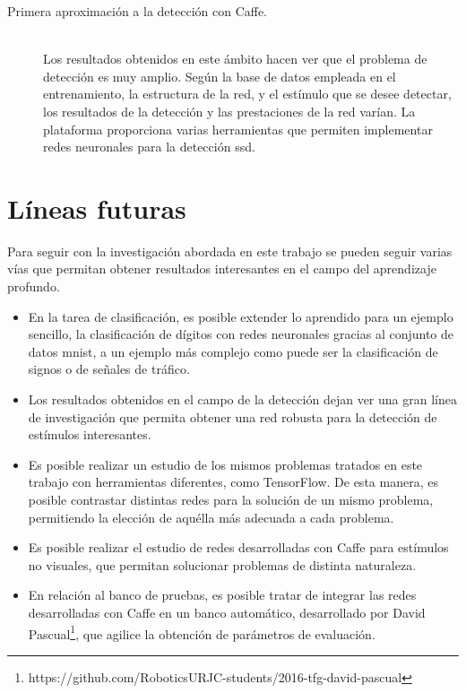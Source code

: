 \begin{description}
	\item[Primera aproximación a la detección con Caffe.] \hfill 
	\vspace{5pt}
	\\
	Los resultados obtenidos en este ámbito hacen ver que el problema de detección es muy amplio. Según la base de datos empleada en el entrenamiento, la estructura de la red, y el estímulo que se desee detectar, los resultados de la detección y las prestaciones de la red varían. La plataforma proporciona varias herramientas que permiten implementar redes neuronales para la detección \acrshort{ssd}.
\end{description}

\section{Líneas futuras}
Para seguir con la investigación abordada en este trabajo se pueden seguir varias vías que permitan obtener resultados interesantes en el campo del aprendizaje profundo.
\begin{itemize}
	\item En la tarea de clasificación, es posible extender lo aprendido para un ejemplo sencillo, la clasificación de dígitos con redes neuronales gracias al conjunto de datos \acrshort{mnist}, a un ejemplo más complejo como puede ser la clasificación de signos o de señales de tráfico.
	\item Los resultados obtenidos en el campo de la detección dejan ver una gran línea de investigación que permita obtener una red robusta para la detección de estímulos interesantes.
	\item Es posible realizar un estudio de los mismos problemas tratados en este trabajo con herramientas diferentes, como TensorFlow. De esta manera, es posible contrastar distintas redes para la solución de un mismo problema, permitiendo la elección de aquélla más adecuada a cada problema.
	\item Es posible realizar el estudio de redes desarrolladas con Caffe para estímulos no visuales, que permitan solucionar problemas de distinta naturaleza.
	\item En relación al banco de pruebas, es posible tratar de integrar las redes desarrolladas con Caffe en un banco automático, desarrollado por David Pascual\footnote{https://github.com/RoboticsURJC-students/2016-tfg-david-pascual}, que agilice la obtención de parámetros de evaluación.
\end{itemize}

